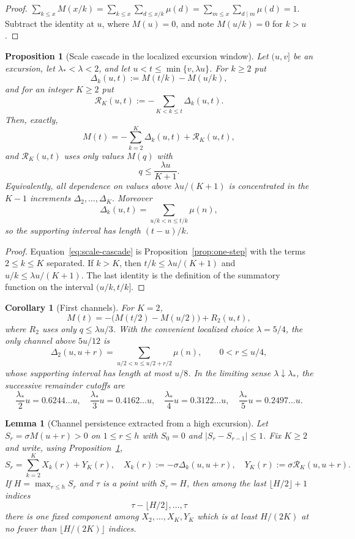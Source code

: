\documentclass[11pt]{amsart}
\numberwithin{equation}{section}
\theoremstyle{plain}
\newtheorem{proposition}[theorem]{Proposition}
\newtheorem{lemma}[theorem]{Lemma}
\newtheorem{corollary}[theorem]{Corollary}
\theoremstyle{definition}
\theoremstyle{remark}
\begin{document}
\begin{proof}
$\sum_{k\le x}M(x/k)=\sum_{k\le x}\sum_{d\le x/k}\mu(d)
=\sum_{m\le x}\sum_{d\mid m}\mu(d)=1$. Subtract the identity at $u$, where
$M(u)=0$, and note $M(u/k)=0$ for $k>u$.
\end{proof}

\begin{proposition}[Scale cascade in the localized excursion window]
\label{prop:scale-cascade}
Let $(u,v]$ be an excursion, let $\lambda_*<\lambda<2$, and let
$u<t\le\min\{v,\lambda u\}$.  For $k\ge2$ put
\[
\Delta_k(u,t):=M(t/k)-M(u/k),
\]
and for an integer $K\ge2$ put
\[
\mathcal R_K(u,t):=-\sum_{K<k\le t}\Delta_k(u,t).
\]
Then, exactly,
\begin{equation}
\label{eq:scale-cascade}
M(t)=-\sum_{k=2}^{K}\Delta_k(u,t)+\mathcal R_K(u,t),
\end{equation}
and $\mathcal R_K(u,t)$ uses only values $M(q)$ with
\[
q\le\frac{\lambda u}{K+1}.
\]
Equivalently, all dependence on values above $\lambda u/(K+1)$ is
concentrated in the $K-1$ increments
$\Delta_2,\ldots,\Delta_K$.  Moreover
\[
\Delta_k(u,t)=\sum_{u/k<n\le t/k}\mu(n),
\]
so the supporting interval has length $(t-u)/k$.
\end{proposition}

\begin{proof}
Equation~\eqref{eq:scale-cascade} is Proposition~\ref{prop:one-step} with
the terms $2\le k\le K$ separated.  If $k>K$, then
$t/k\le\lambda u/(K+1)$ and $u/k\le\lambda u/(K+1)$.  The last identity is
the definition of the summatory function on the interval $(u/k,t/k]$.
\end{proof}

\begin{corollary}[First channels]
\label{cor:first-channels}
For $K=2$,
\[
M(t)=-\bigl(M(t/2)-M(u/2)\bigr)+R_2(u,t),
\]
where $R_2$ uses only $q\le\lambda u/3$.  With the convenient localized
choice $\lambda=5/4$, the only channel above $5u/12$ is
\[
\Delta_2(u,u+r)=\sum_{u/2<n\le u/2+r/2}\mu(n),
\qquad 0<r\le u/4,
\]
whose supporting interval has length at most $u/8$.  In the limiting
sense $\lambda\downarrow\lambda_*$, the successive remainder cutoffs are
\[
\frac{\lambda_*}{2}u=0.6244\ldots u,\quad
\frac{\lambda_*}{3}u=0.4162\ldots u,\quad
\frac{\lambda_*}{4}u=0.3122\ldots u,\quad
\frac{\lambda_*}{5}u=0.2497\ldots u.
\]
\end{corollary}

\begin{lemma}[Channel persistence extracted from a high excursion]
\label{lem:channel-persistence}
Let $S_r=\sigma M(u+r)>0$ on $1\le r\le h$ with $S_0=0$ and
$|S_r-S_{r-1}|\le1$.  Fix $K\ge2$ and write, using
Proposition~\ref{prop:scale-cascade},
\[
S_r=\sum_{k=2}^{K}X_k(r)+Y_K(r),
\quad
X_k(r):=-\sigma\Delta_k(u,u+r),
\quad
Y_K(r):=\sigma \mathcal R_K(u,u+r).
\]
If $H=\max_{r\le h}S_r$ and $\tau$ is a point with $S_\tau=H$, then among
the last $\lfloor H/2\rfloor+1$ indices
\[
\tau-\lfloor H/2\rfloor,\ldots,\tau
\]
there is one fixed component among
$X_2,\ldots,X_K,Y_K$ which is at least $H/(2K)$ at no fewer than
$\lfloor H/(2K)\rfloor$ indices.
\end{lemma}
\end{document}
